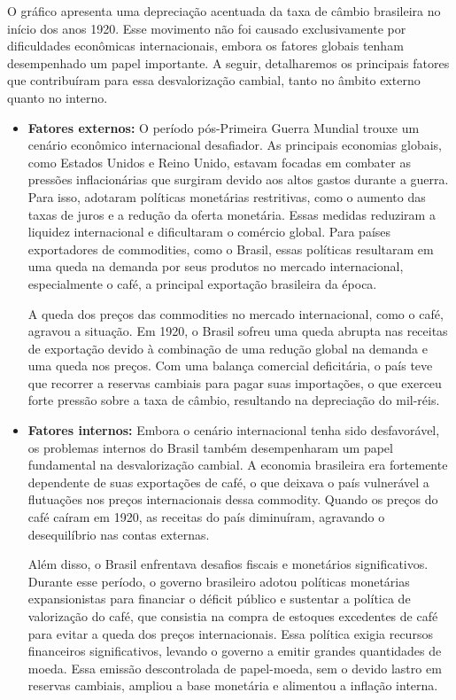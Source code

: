 \documentclass[a4paper,12pt]{article}[abntex2]
\begin{document}
O gráfico apresenta uma depreciação acentuada da taxa de câmbio brasileira no início dos anos 1920. Esse movimento não foi causado exclusivamente por dificuldades econômicas internacionais, embora os fatores globais tenham desempenhado um papel importante. A seguir, detalharemos os principais fatores que contribuíram para essa desvalorização cambial, tanto no âmbito externo quanto no interno.

\begin{itemize}
    \item \textbf{Fatores externos:}
    O período pós-Primeira Guerra Mundial trouxe um cenário econômico internacional desafiador. As principais economias globais, como Estados Unidos e Reino Unido, estavam focadas em combater as pressões inflacionárias que surgiram devido aos altos gastos durante a guerra. Para isso, adotaram políticas monetárias restritivas, como o aumento das taxas de juros e a redução da oferta monetária. Essas medidas reduziram a liquidez internacional e dificultaram o comércio global. Para países exportadores de commodities, como o Brasil, essas políticas resultaram em uma queda na demanda por seus produtos no mercado internacional, especialmente o café, a principal exportação brasileira da época. 
    
    A queda dos preços das commodities no mercado internacional, como o café, agravou a situação. Em 1920, o Brasil sofreu uma queda abrupta nas receitas de exportação devido à combinação de uma redução global na demanda e uma queda nos preços. Com uma balança comercial deficitária, o país teve que recorrer a reservas cambiais para pagar suas importações, o que exerceu forte pressão sobre a taxa de câmbio, resultando na depreciação do mil-réis.
    
    \item \textbf{Fatores internos:}
    Embora o cenário internacional tenha sido desfavorável, os problemas internos do Brasil também desempenharam um papel fundamental na desvalorização cambial. A economia brasileira era fortemente dependente de suas exportações de café, o que deixava o país vulnerável a flutuações nos preços internacionais dessa commodity. Quando os preços do café caíram em 1920, as receitas do país diminuíram, agravando o desequilíbrio nas contas externas.
    
    Além disso, o Brasil enfrentava desafios fiscais e monetários significativos. Durante esse período, o governo brasileiro adotou políticas monetárias expansionistas para financiar o déficit público e sustentar a política de valorização do café, que consistia na compra de estoques excedentes de café para evitar a queda dos preços internacionais. Essa política exigia recursos financeiros significativos, levando o governo a emitir grandes quantidades de moeda. Essa emissão descontrolada de papel-moeda, sem o devido lastro em reservas cambiais, ampliou a base monetária e alimentou a inflação interna.
    

\end{itemize}
\end{document}
